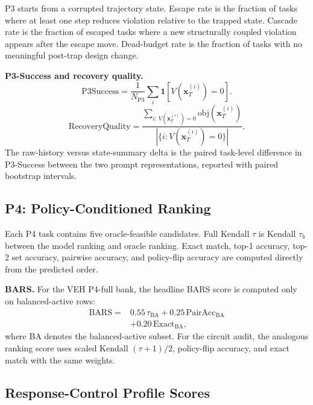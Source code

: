 P3 starts from a corrupted trajectory state. Escape rate is the fraction of tasks where at least one step reduces violation relative to the trapped state. Cascade rate is the fraction of escaped tasks where a new structurally coupled violation appears after the escape move. Dead-budget rate is the fraction of tasks with no meaningful post-trap design change.

\textbf{P3-Success and recovery quality.}
\begin{equation}
\mathrm{P3Success}
= \frac{1}{N_{\mathrm{P3}}}
\sum_i \mathbf{1}\!\left[V(\mathbf{x}^{(i)}_T)=0\right].
\end{equation}
\begin{equation}
\mathrm{RecoveryQuality}
=
\frac{
\sum_{i:\,V(\mathbf{x}^{(i)}_T)=0}
\mathrm{obj}(\mathbf{x}^{(i)}_T)}
{|\{i: V(\mathbf{x}^{(i)}_T)=0\}|}.
\end{equation}
The raw-history versus state-summary delta is the paired task-level difference in P3-Success between the two prompt representations, reported with paired bootstrap intervals.

\subsection{P4: Policy-Conditioned Ranking}

Each P4 task contains five oracle-feasible candidates. Full Kendall \(\tau\) is Kendall \(\tau_b\) between the model ranking and oracle ranking. Exact match, top-1 accuracy, top-2 set accuracy, pairwise accuracy, and policy-flip accuracy are computed directly from the predicted order.

\textbf{BARS.} For the VEH P4-full bank, the headline BARS score is computed only on balanced-active rows:
\begin{equation}
\begin{aligned}
\mathrm{BARS}
= {}&0.55\,\tau_{\mathrm{BA}}
+0.25\,\mathrm{PairAcc}_{\mathrm{BA}} \\
&+0.20\,\mathrm{Exact}_{\mathrm{BA}},
\end{aligned}
\end{equation}
where BA denotes the balanced-active subset. For the circuit audit, the analogous ranking score uses scaled Kendall \((\tau+1)/2\), policy-flip accuracy, and exact match with the same weights.

\subsection{Response-Control Profile Scores}

